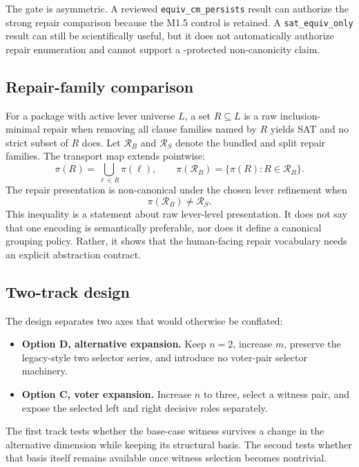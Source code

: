 The gate is asymmetric.  A reviewed
\texttt{equiv\_cm\_persists} result can authorize the strong repair comparison
because the M1.5 control is retained.  A \texttt{sat\_equiv\_only} result can
still be scientifically useful, but it does not automatically authorize repair
enumeration and cannot support a \CM-protected non-canonicity claim.

\subsection{Repair-family comparison}

For a package with active lever universe $L$, a set $R\subseteq L$ is a raw
inclusion-minimal repair when removing all clause families named by $R$ yields
SAT and no strict subset of $R$ does.  Let $\mathcal{R}_B$ and
$\mathcal{R}_S$ denote the bundled and split repair families.
The transport map extends pointwise:
\[
  \pi(R)=\bigcup_{\ell\in R}\pi(\ell),
  \qquad
  \pi(\mathcal{R}_B)=\{\pi(R):R\in\mathcal{R}_B\}.
\]
The repair presentation is non-canonical under the chosen lever refinement
when
\[
  \pi(\mathcal{R}_B)\ne\mathcal{R}_S.
\]
This inequality is a statement about raw lever-level presentation.  It does not
say that one encoding is semantically preferable, nor does it define a
canonical grouping policy.  Rather, it shows that the human-facing repair
vocabulary needs an explicit abstraction contract.

\subsection{Two-track design}

The design separates two axes that would otherwise be conflated:
\begin{itemize}
  \item \textbf{Option D, alternative expansion.}  Keep $n=2$, increase $m$,
  preserve the legacy-style two selector series, and introduce no voter-pair
  selector machinery.
  \item \textbf{Option C, voter expansion.}  Increase $n$ to three, select a
  witness pair, and expose the selected left and right decisive roles
  separately.
\end{itemize}
The first track tests whether the base-case witness survives a change in the
alternative dimension while keeping its structural basis.  The second tests
whether that basis itself remains available once witness selection becomes
nontrivial.

